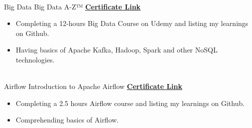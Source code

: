 \documentclass[letterpaper]{DS_class_file} %
\begin{document}
\begin{twenty}
{	}
	\\
	\twentyitem
	{Big Data}
	{}
	{\hspace{0.3cm}Big Data A-Z™}
	{\href{https://www.udemy.com/certificate/UC-4a851250-cc99-4a9d-8f7c-d8a32ed0a832/}{\textbf{Certificate Link}}}
	{}
	{
		{\begin{itemize}
				\item Completing a 12-hours Big Data Course on Udemy and listing my learnings on Github.
				\item Having basics of Apache Kafka, Hadoop, Spark and other NoSQL technologies.
		\end{itemize}}
	}
	\\
	\twentyitem
	{Airflow}
	{}
	{\hspace{0.3cm}Introduction to Apache Airflow}
	{\href{https://www.udemy.com/certificate/UC-634f3164-fcb1-4bdf-b5b0-909134dd3252/}{\textbf{Certificate Link}}}
	{}
	{
		{\begin{itemize}
				\item Completing a 2.5 hours Airflow course and listing my learnings on Github.
				\item Comprehending basics of Airflow.
		\end{itemize}}
	}
	

	
\end{twenty}



	
\end{document}
